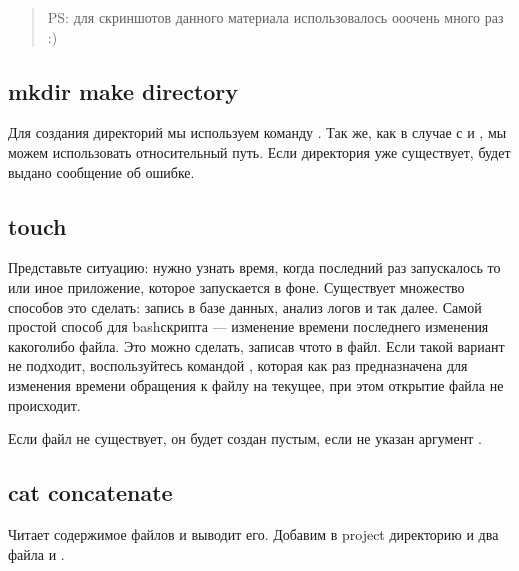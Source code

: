 \documentclass[letterpaper,10pt,russian]{sphinxmanual}
\begin{document}
\sphinxAtStartPar
{}
\begin{quote}

\sphinxAtStartPar
PS: для скриншотов данного материала  использовалось ооочень много раз :)
\end{quote}


\subsection{mkdir \sphinxhyphen{} make directory}
\label{\detokenize{educational_materials/bash/content:mkdir-make-directory}}
\sphinxAtStartPar
Для создания директорий мы используем команду . Так же, как в случае с  и , мы можем использовать относительный путь. Если директория уже существует, будет выдано сообщение об ошибке.

\sphinxAtStartPar
{}


\subsection{touch}
\label{\detokenize{educational_materials/bash/content:touch}}
\sphinxAtStartPar
Представьте ситуацию: нужно узнать время, когда последний раз запускалось то или иное приложение, которое запускается в фоне. Существует множество способов это сделать: запись в базе данных, анализ логов и так далее. Самой простой способ для bash\sphinxhyphen{}скрипта — изменение времени последнего изменения какого\sphinxhyphen{}либо файла. Это можно сделать, записав что\sphinxhyphen{}то в файл. Если такой вариант не подходит, воспользуйтесь командой , которая как раз предназначена для изменения времени обращения к файлу на текущее, при этом открытие файла не происходит.

\sphinxAtStartPar
{}

\sphinxAtStartPar
Если файл не существует, он будет создан пустым, если не указан аргумент .

\sphinxAtStartPar
{}


\subsection{cat \sphinxhyphen{} concatenate}
\label{\detokenize{educational_materials/bash/content:cat-concatenate}}
\sphinxAtStartPar
Читает содержимое файлов и выводит его. Добавим в project директорию  и два файла  и .
\end{document}
